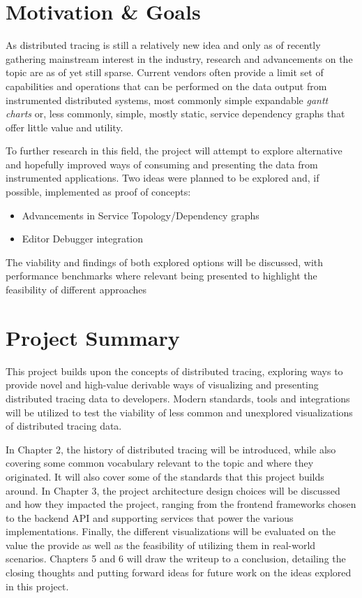 \documentclass[12pt,pdftex,titlepage]{report}
\begin{document}
        \section{Motivation \& Goals}
            As distributed tracing is still a relatively new idea and only as of recently gathering mainstream interest in the industry, research and advancements on the topic are 
            as of yet still sparse. Current vendors often provide a limit set of capabilities and operations that can be performed on the data output from instrumented distributed systems,
            most commonly simple expandable \textit{gantt charts} or, less commonly, simple, mostly static, service dependency graphs that offer little value and utility.

            To further research in this field, the project will attempt to explore alternative and hopefully improved ways of consuming and presenting the data from instrumented
            applications. Two ideas were planned to be explored and, if possible, implemented as proof of concepts:

            \begin{itemize}
                \item Advancements in Service Topology/Dependency graphs
                \item Editor Debugger integration                
            \end{itemize}

            The viability and findings of both explored options will be discussed, with performance benchmarks where relevant being presented to highlight the feasibility of different
            approaches 

        \section{Project Summary}
            This project builds upon the concepts of distributed tracing, exploring ways to provide novel and high-value derivable ways of visualizing and presenting distributed tracing
            data to developers. Modern standards, tools and integrations will be utilized to test the viability of less common and unexplored visualizations of distributed tracing data.

            In Chapter 2, the history of distributed tracing will be introduced, while also covering some common vocabulary relevant to the topic and where they originated. It will also
            cover some of the standards that this project builds around. In Chapter 3, the project architecture design choices will be discussed and how they impacted the project, ranging
            from the frontend frameworks chosen to the backend API and supporting services that power the various implementations. Finally, the different visualizations will be evaluated
            on the value the provide as well as the feasibility of utilizing them in real-world scenarios. Chapters 5 and 6 will draw the writeup to a conclusion, detailing the closing
            thoughts and putting forward ideas for future work on the ideas explored in this project.
\end{document}
